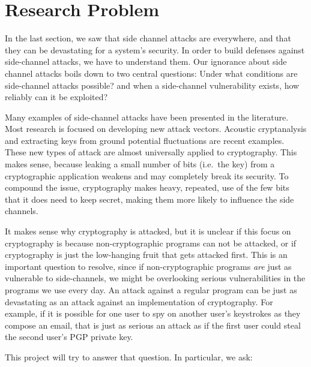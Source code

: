 \documentclass{acm_proc_article-sp}
\begin{document}
\section{Research Problem}
\label{sec:problem}

In the last section, we saw that side channel attacks are everywhere, and that
they can be devastating for a system's security. In order to build defenses
against side-channel attacks, we have to understand them. Our ignorance about
side channel attacks boils down to two central questions: Under what conditions
are side-channel attacks possible? and when a side-channel vulnerability exists,
how reliably can it be exploited?

Many examples of side-channel attacks have been presented in the literature.
Most research is focused on developing new attack vectors. Acoustic
cryptanalysis \cite{genkin2013rsa} and extracting keys from ground potential
fluctuations \cite{genkin2014get} are recent examples. These new types of attack
are almost universally applied to cryptography. This makes sense, because
leaking a small number of bits (i.e.\ the key) from a cryptographic application
weakens and may completely break its security. To compound the issue,
cryptography makes heavy, repeated, use of the few bits that it does need to
keep secret, making them more likely to influence the side channels.

It makes sense why cryptography is attacked, but it is unclear if this focus on
cryptography is because non-cryptographic programs can not be attacked, or if
cryptography is just the low-hanging fruit that gets attacked first. This is an
important question to resolve, since if non-cryptographic programs \emph{are}
just as vulnerable to side-channels, we might be overlooking serious
vulnerabilities in the programs we use every day. An attack against a regular
program can be just as devastating as an attack against an implementation of
cryptography. For example, if it is possible for one user to spy on another
user's keystrokes as they compose an email, that is just as serious an attack as
if the first user could steal the second user's PGP private key.

This project will try to answer that question. In particular, we ask:
\end{document}
